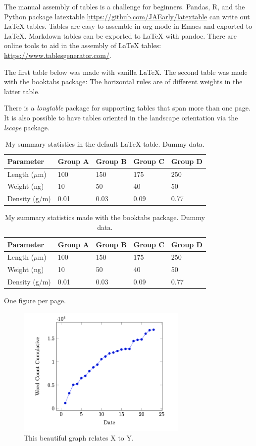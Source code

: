 \documentclass[11pt,letterpaper]{article}
\begin{document}
The manual assembly of tables is a challenge for beginners.
Pandas, R, and the Python package latextable \url{https://github.com/JAEarly/latextable} can write out \LaTeX{} tables.
Tables are easy to assemble in org-mode in Emacs and exported to \LaTeX{}.
Markdown tables can be exported to \LaTeX{} with pandoc.
There are online tools to aid in the assembly of \LaTeX{} tables: \url{https://www.tablesgenerator.com/}.

The first table below was made with vanilla \LaTeX{}.
The second table was made with the booktabs package: The horizontal rules are of different weights in the latter table.

There is a \emph{longtable} package for supporting tables that span more than one page.
It is also possible to have tables oriented in the landscape orientation via the \emph{lscape} package.



\newpage

\begin{table}[htp]
\centering
\caption{\label{tab:first} My summary statistics in the default LaTeX table. Dummy data.}
\begin{tabular}{lllll}\hline
Parameter & Group A & Group B & Group C &  Group D \\ \hline
Length ($\mu$m) & 100 & 150 & 175 &  250\\
Weight (ng)  &  10 &  50 & 40  &  50\\
Density (g/m) & 0.01  & 0.03  &  0.09 &  0.77\\ \hline
\end{tabular}
\end{table}


\newpage


\begin{table}[htp]
\centering
\caption{\label{tab:second} My summary statistics made with the booktabs package. Dummy data.}
\begin{tabular}{lllll}\toprule %
Parameter & Group A & Group B & Group C &  Group D \\ \midrule
Length ($\mu$m) & 100 & 150 & 175 &  250\\
Weight (ng)  &  10 &  50 & 40  &  50\\
Density (g/m) & 0.01  & 0.03  &  0.09 &  0.77\\ \bottomrule
\end{tabular}
\end{table}


\newpage
\listoffigures
One figure per page.

\newpage

\begin{figure}[htp]
\begin{center}
\includegraphics[width=3.25in]{./figs/wcPlot}
\caption{\label{fig:labelA} This beautiful graph relates X to Y. }
\end{center}
\end{figure}
\end{document}

